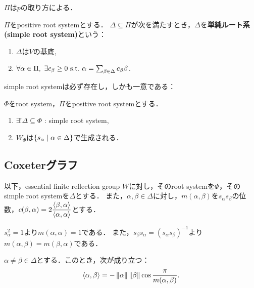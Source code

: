 \begin{remark}
  $\Pi$は$p$の取り方による．
\end{remark}

\begin{definition}
  $\Pi$をpositive root systemとする．
  $\Delta \subseteq \Pi$が次を満たすとき，$\Delta$を\textbf{単純ルート系(simple root system)}という：
  \begin{enumerate}[label=(\roman*)]
    \item $\Delta$は$V$の基底,
    \item $\forall \alpha \in \Pi,\ \exists c_\beta \ge 0 \ \text{s.t.}\  \alpha = \sum_{\beta \in \Delta} c_\beta \beta$.
  \end{enumerate}
\end{definition}

simple root systemは必ず存在し，しかも一意である：

\begin{fact}
  $\Phi$をroot system，$\Pi$をpositive root systemとする．
  \begin{enumerate}[label=(\arabic*)]
    \item $\exists! \Delta \subseteq \Phi$ : simple root system,
    \item $W_\Phi$は$\left\lbrace s_\alpha \mathrel{} \middle| \mathrel{} \alpha \in \Delta \right\rbrace$で生成される．
  \end{enumerate}
\end{fact}

\subsection{Coxeterグラフ}
以下，essential finite reflection group $W$に対し，そのroot systemを$\Phi$，そのsimple root systemを$\Delta$とする．
また，$\alpha, \beta \in \Delta$に対し，$m(\alpha, \beta)$を$s_\alpha s_\beta$の位数，$c(\beta, \alpha) = 2\dfrac{\left\langle \beta, \alpha \right\rangle}{\left\langle \alpha, \alpha \right\rangle}$とする．

\begin{remark}
  $s_\alpha^2 = 1$より$m(\alpha, \alpha) = 1$である．
  また，$s_\beta s_\alpha = (s_\alpha s_\beta)^{-1}$より$m(\alpha, \beta) = m(\beta, \alpha)$である．
\end{remark}

\begin{lemma} \label{lem:inner_cos}
  $\alpha \ne \beta \in \Delta$とする．このとき，次が成り立つ：
  \begin{equation}
    \left\langle \alpha, \beta \right\rangle
    = -\left\| \alpha \right\| \left\| \beta \right\| \cos\frac{\pi}{m(\alpha, \beta)}.
  \end{equation}
\end{lemma}

